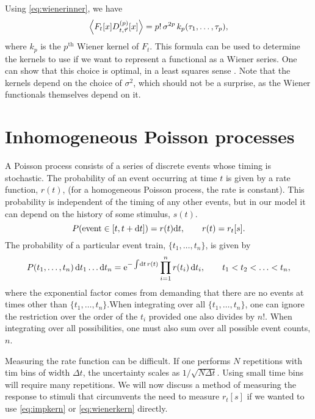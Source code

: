 \documentclass[12pt]{article}
\theoremstyle{slplain}
\theoremstyle{sldefinition}
\theoremstyle{remark}
\begin{document}
Using \eqref{eq:wienerinner}, we have
%
\begin{equation}\label{eq:wienerkern}
  \left\langle F_t[x] D^{(p)}_{t,\vec{\tau}}[x] \right\rangle = p!\,\sigma^{2p}\,k_p(\tau_1,\ldots,\tau_p),
\end{equation}
%
where $k_p$ is the $p^{\text{th}}$ Wiener kernel of $F_t$. This formula can be used to determine the kernels to use if we want to represent a functional as a Wiener series. One can show that this choice is optimal, in a least squares sense \cite[\S15.2]{schetzen:1980}. Note that the kernels depend on the choice of $\sigma^2$, which should not be a surprise, as the Wiener functionals themselves depend on it.




\section{Inhomogeneous Poisson processes}\label{sec:poisson}

A Poisson process consists of a series of discrete events whose timing is stochastic. The probability of an event occurring at time $t$ is given by a rate function, $r(t)$, (for a homogeneous Poisson process, the rate is constant). This probability is independent of the timing of any other events, but in our model it can depend on the history of some stimulus, $s(t)$.
%
\begin{equation}\label{eq:poissonrate}
  P(\text{event}\in[t,t+\mathrm{d} t]) = r(t)\mathrm{d} t,
  \qquad
  r(t) = r_t[s].
\end{equation}
%
The probability of a particular event train, $\{t_1,\ldots,t_n\}$, is given by
%
\begin{equation}\label{eq:evtrain}
  P(t_1,\ldots,t_n)\,\mathrm{d} t_1\ldots \mathrm{d} t_n = \mathrm{e}^{-\int\!\mathrm{d} t\,r(t)} \prod_{i=1}^n r(t_i)\,\mathrm{d} t_i, \qquad t_1<t_2<\ldots<t_n,
\end{equation}
%
where the exponential factor comes from demanding that there are no events at times other than $\{t_1,\ldots,t_n\}$.When integrating over all $\{t_1,\ldots,t_n\}$, one can ignore the restriction over the order of the $t_i$ provided one also divides by $n!$. When integrating over all possibilities, one must also sum over all possible event counts, $n$.

Measuring the rate function can be difficult. If one performs $N$ repetitions with tim bins of width $\Delta t$, the uncertainty scales as $1/\sqrt{N\Delta t}$. Using small time bins will require many repetitions. We will now discuss a method of measuring the response to stimuli that circumvents the need to measure $r_t[s]$ if we wanted to use \eqref{eq:impkern} or \eqref{eq:wienerkern} directly. 
\end{document}
